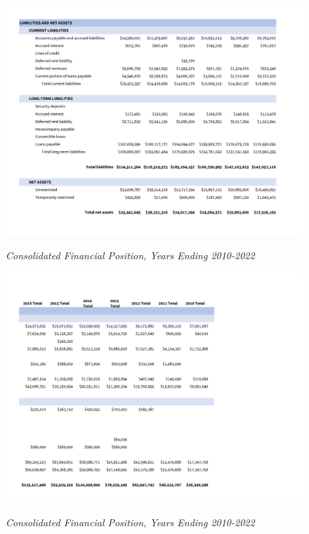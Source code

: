 \begin{figure}[hbt]
    \caption[Consolidated Financial Position, Years Ending 2010–2022]{\textit{Consolidated Financial Position, Years Ending 2010-2022}}\label{fig:consolidated_financial_position_2010-2022-2} %
    \includegraphics[width=\textwidth]{Consolidated Financial Statements/v5 Spreadsheets/Consolidated_Financial_Position_Years_2010-2022 PDF pages/.pg_0002}\\ %
\end{figure}
\begin{figure}[hbt]
    \caption[Consolidated Financial Position, Years Ending 2010–2022]{\textit{Consolidated Financial Position, Years Ending 2010-2022}}\label{fig:consolidated_financial_position_2010-2022-3} %
    \includegraphics[width=\textwidth]{Consolidated Financial Statements/v5 Spreadsheets/Consolidated_Financial_Position_Years_2010-2022 PDF pages/.pg_0003}\\ %
\end{figure}
